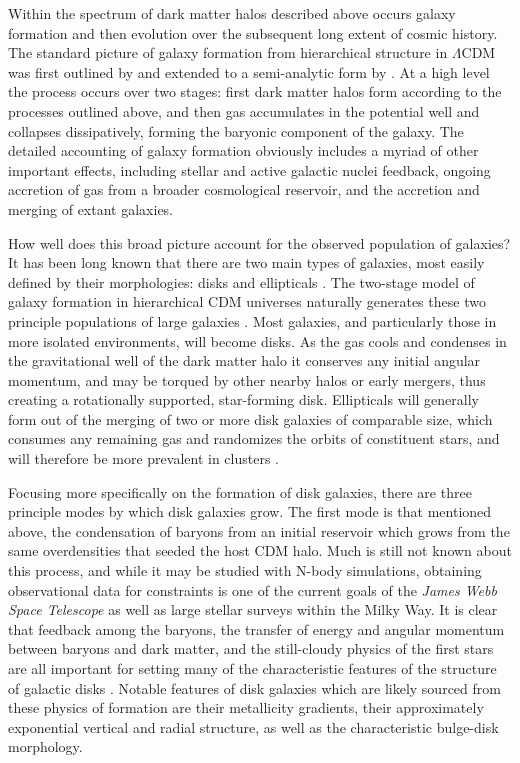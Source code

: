 Within the spectrum of dark matter halos described above occurs galaxy formation and then evolution over the subsequent long extent of cosmic history. The standard picture of galaxy formation from hierarchical structure in $\Lambda$CDM was first outlined by \textcite{white78} and extended to a semi-analytic form by \textcite{white91}. At a high level the process occurs over two stages: first dark matter halos form according to the processes outlined above, and then gas accumulates in the potential well and collapses dissipatively, forming the baryonic component of the galaxy. The detailed accounting of galaxy formation obviously includes a myriad of other important effects, including stellar and active galactic nuclei feedback, ongoing accretion of gas from a broader cosmological reservoir, and the accretion and merging of extant galaxies.

How well does this broad picture account for the observed population of galaxies? It has been long known that there are two main types of galaxies, most easily defined by their morphologies: disks and ellipticals \parencite[e.g. the famous ``tuning fork'' classification of][]{hubble26}. The two-stage model of galaxy formation in hierarchical CDM universes naturally generates these two principle populations of large galaxies \parencite{fall79,efstathiou83,blumenthal84}. Most galaxies, and particularly those in more isolated environments, will become disks. As the gas cools and condenses in the gravitational well of the dark matter halo it conserves any initial angular momentum, and may be torqued by other nearby halos or early mergers, thus creating a rotationally supported, star-forming disk. Ellipticals will generally form out of the merging of two or more disk galaxies of comparable size, which consumes any remaining gas and randomizes the orbits of constituent stars, and will therefore be more prevalent in clusters \parencite{toomre72,gerhard81,barnes88}.

Focusing more specifically on the formation of disk galaxies, there are three principle modes by which disk galaxies grow. The first mode is that mentioned above, the condensation of baryons from an initial reservoir which grows from the same overdensities that seeded the host CDM halo. Much is still not known about this process, and while it may be studied with N-body simulations, obtaining observational data for constraints is one of the current goals of the \textit{James Webb Space Telescope} as well as large stellar surveys within the Milky Way. It is clear that feedback among the baryons, the transfer of energy and angular momentum between baryons and dark matter, and the still-cloudy physics of the first stars are all important for setting many of the characteristic features of the structure of galactic disks \parencite{vandenbosch01}. Notable features of disk galaxies which are likely sourced from these physics of formation are their metallicity gradients, their approximately exponential vertical and radial structure, as well as the characteristic bulge-disk morphology.

